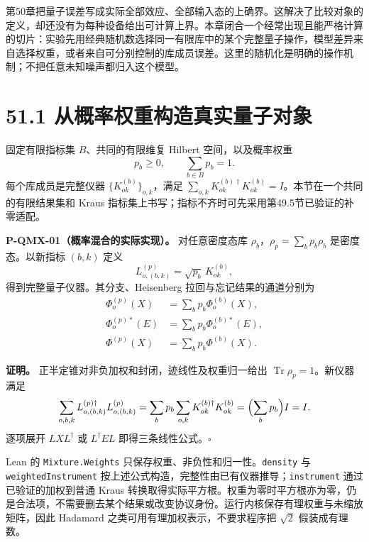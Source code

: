 \documentclass[
  11pt,
  oneside]{book}
\begin{document}
第50章把量子误差写成实际全部效应、全部输入态的上确界。这解决了比较对象的定义，却还没有为每种设备给出可计算上界。本章闭合一个经常出现且能严格计算的切片：实验先用经典随机数选择同一有限库中的某个完整量子操作，模型差异来自选择权重，或者来自可分别控制的库成员误差。这里的随机化是明确的操作机制；不把任意未知噪声都归入这个模型。

\hypertarget{ux4eceux6982ux7387ux6743ux91cdux6784ux9020ux771fux5b9eux91cfux5b50ux5bf9ux8c61}{%
\section{51.1
从概率权重构造真实量子对象}\label{ux4eceux6982ux7387ux6743ux91cdux6784ux9020ux771fux5b9eux91cfux5b50ux5bf9ux8c61}}

固定有限指标集 \(B\)、共同的有限维复 Hilbert 空间，以及概率权重 \[
p_b\ge0,\qquad \sum_{b\in B}p_b=1.
\] 每个库成员是完整仪器 \(\{K^{(b)}_{ok}\}_{o,k}\)，满足
\(\sum_{o,k}K^{(b)\dagger}_{ok}K^{(b)}_{ok}=I\)。本节在一个共同的有限结果集和
Kraus 指标集上书写；指标不齐时可先采用第49.5节已验证的补零适配。

\protect\hypertarget{p-qmx-01}{}{}

\textbf{P-QMX-01（概率混合的实际实现）。} 对任意密度态库
\(\rho_b\)，\(\rho_p=\sum_b p_b\rho_b\) 是密度态。以新指标 \((b,k)\)
定义 \[
L^{(p)}_{o,(b,k)}=\sqrt{p_b}\,K^{(b)}_{ok},
\] 得到完整量子仪器。其分支、Heisenberg 拉回与忘记结果的通道分别为 \[
\begin{aligned}
\Phi^{(p)}_o(X)&=\sum_b p_b\Phi^{(b)}_o(X),\\
\Phi^{(p)*}_o(E)&=\sum_b p_b\Phi^{(b)*}_o(E),\\
\Phi^{(p)}(X)&=\sum_b p_b\Phi^{(b)}(X).
\end{aligned}
\]

\textbf{证明。} 正半定锥对非负加权和封闭，迹线性及权重归一给出
\(\operatorname{Tr}\rho_p=1\)。新仪器满足 \[
\sum_{o,b,k}L^{(p)\dagger}_{o,(b,k)}L^{(p)}_{o,(b,k)}
=\sum_b p_b\sum_{o,k}K^{(b)\dagger}_{ok}K^{(b)}_{ok}
=\Bigl(\sum_b p_b\Bigr)I=I.
\] 逐项展开 \(LXL^\dagger\) 或 \(L^\dagger EL\)
即得三条线性公式。\(\square\)

Lean 的 \texttt{Mixture.Weights}
只保存权重、非负性和归一性。\texttt{density} 与
\texttt{weightedInstrument}
按上述公式构造，完整性由已有仪器推导；\texttt{instrument}
通过已验证的加权到普通 Kraus
转换取得实际平方根。权重为零时平方根亦为零，仍是合法项，不需要删去某个结果或改变协议身份。运行内核保存有理权重与未缩放矩阵，因此
Hadamard 之类可用有理加权表示，不要求程序把 \(\sqrt2\) 假装成有理数。
\end{document}
